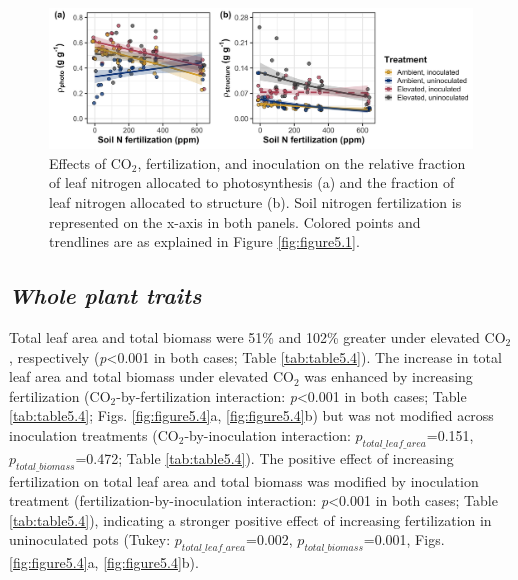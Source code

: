 \newpage
    \begin{figure}
        \centering
        \includegraphics[width=\columnwidth]{ch5_NxCO2xI/figs/NxCO2xI_fig3_propN.jpg}
        \caption[Effects of CO$_2$, fertilization, and inoculation on the relative fraction of leaf nitrogen allocated to photosynthesis and the fraction of leaf nitrogen allocated to structure]{Effects of CO$_2$, fertilization, and inoculation on the relative fraction of leaf nitrogen allocated to photosynthesis (a) and the fraction of leaf nitrogen allocated to structure (b). Soil nitrogen fertilization is represented on the x-axis in both panels. Colored points and trendlines are as explained in Figure \ref{fig:figure5.1}.}
        \label{fig:figure5.3}
    \end{figure}
\clearpage

\subsection{\textit{Whole plant traits}}
\noindent Total leaf area and total biomass were 51\% and 102\% greater under elevated CO$_2$, respectively (\textit{p}<0.001 in both cases; Table \ref{tab:table5.4}). The increase in total leaf area and total biomass under elevated CO$_2$ was enhanced by increasing fertilization (CO$_2$-by-fertilization interaction: \textit{p}<0.001 in both cases; Table \ref{tab:table5.4}; Figs. \ref{fig:figure5.4}a, \ref{fig:figure5.4}b) but was not modified across inoculation treatments (CO$_2$-by-inoculation interaction: $p_{total\_leaf\_area}$=0.151, $p_{total\_biomass}$=0.472; Table \ref{tab:table5.4}). The positive effect of increasing fertilization on total leaf area and total biomass was modified by inoculation treatment (fertilization-by-inoculation interaction: \textit{p}<0.001 in both cases; Table \ref{tab:table5.4}), indicating a stronger positive effect of increasing fertilization in uninoculated pots (Tukey: $p_{total\_leaf\_area}$=0.002, $p_{total\_biomass}$=0.001, Figs. \ref{fig:figure5.4}a, \ref{fig:figure5.4}b).


